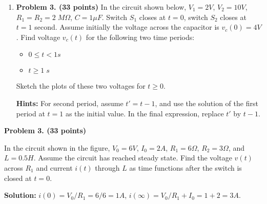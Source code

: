 \begin{enumerate}
\item {\bf Problem 3. (33 points)} In the circuit shown below, $V_1=2V$,
$V_2=10V$, $R_1=R_2=2\;M\Omega$, $C=1\mu F$. Switch $S_1$ closes at $t=0$, 
switch $S_2$ closes at $t=1$ second. Assume initially the voltage across
the capacitor is $v_c(0)=4V$. Find voltage $v_c(t)$ for the following 
two time periods:
\begin{itemize}
\item $0\le t < 1 s$
\item $t \ge 1\;s$ 
\end{itemize}
Sketch the plots of these two voltages for $t \ge 0$.

{\bf Hints:} For second period, assume $t'=t-1$, and use the solution of
the first period at $t=1$ as the initial value. In the final expression, 
replace $t'$ by $t-1$.


%   
%  
%  

\end{enumerate}



\item {\bf Problem 3. (33 points)} 

In the circuit shown in the figure, $V_0=6V$, $I_0=2A$, $R_1=6\Omega$, 
$R_2=3\Omega$, and $L=0.5H$. Assume the circuit has reached steady state.
Find the voltage $v(t)$ across $R_1$ and current $i(t)$ through $L$ as 
time functions after the switch is closed at $t=0$.


{\bf Solution:} 
$i(0)=V_0/R_1=6/6=1A$, $i(\infty)=V_0/R_1+I_0=1+2=3A$. 

